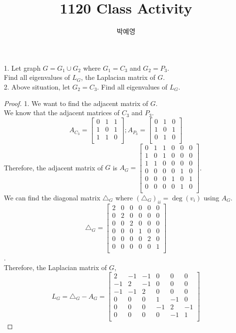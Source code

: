 \documentclass[a4paper, 12pt]{article}
\title{1120 Class Activity}
\author{박예영}
\date{}
\begin{document}
\maketitle
\begin{mdframed}
1. Let graph $G = G_1 \cup G_2$ where $G_1 = C_3$ and $G_2 = P_3$.\\Find all eigenvalues of $L_G$, the Laplacian matrix of $G$.\\
2. Above situation, let $G_2 = C_3$. Find all eigenvalues of $L_G$.
\end{mdframed}

\begin{proof}
1. We want to find the adjacent matrix of $G$.\\
We know that the adjacent matrices of $C_3$ and $P_3$.\\
$$A_{C_3} = \begin{bmatrix}0&1&1\\1&0&1\\1&1&0\\ \end{bmatrix} ; A_{P_3} = \begin{bmatrix}0&1&0\\1&0&1\\0&1&0\\ \end{bmatrix}$$
Therefore, the adjacent matrix of $G$ is $A_G = \begin{bmatrix}0&1&1&0&0&0\\1&0&1&0&0&0\\1&1&0&0&0&0\\0&0&0&0&1&0\\0&0&0&1&0&1\\0&0&0&0&1&0\\ \end{bmatrix}$.\\
We can find the diagonal matrix $\triangle _G$ where $(\triangle _G)_{ii} = \deg (v_i)$ using $A_G$.\\
$$\triangle _G = \begin{bmatrix}2&0&0&0&0&0\\0&2&0&0&0&0\\0&0&2&0&0&0\\0&0&0&1&0&0\\0&0&0&0&2&0\\0&0&0&0&0&1\\ \end{bmatrix}$$.\\
Therefore, the Laplacian matrix of $G$, $$L_G = \triangle _G - A_G = \begin{bmatrix}2&-1&-1&0&0&0\\-1&2&-1&0&0&0\\-1&-1&2&0&0&0\\0&0&0&1&-1&0\\0&0&0&-1&2&-1\\0&0&0&0&-1&1\\ \end{bmatrix}$$

\end{proof}
\end{document}
